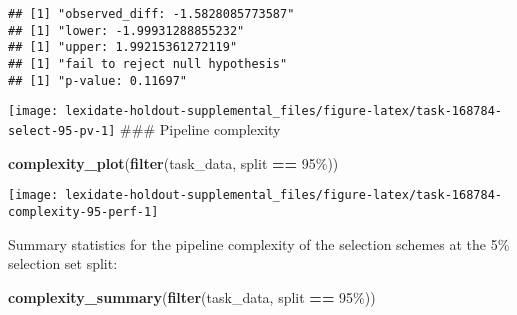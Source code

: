 \documentclass[
]{book}
\newenvironment{Shaded}{\begin{snugshade}}{\end{snugshade}}
\newcommand{\AttributeTok}[1]{\textcolor[rgb]{0.13,0.29,0.53}{#1}}
\newcommand{\DecValTok}[1]{\textcolor[rgb]{0.00,0.00,0.81}{#1}}
\newcommand{\FunctionTok}[1]{\textcolor[rgb]{0.13,0.29,0.53}{\textbf{#1}}}
\newcommand{\NormalTok}[1]{#1}
\newcommand{\OtherTok}[1]{\textcolor[rgb]{0.56,0.35,0.01}{#1}}
\newcommand{\SpecialCharTok}[1]{\textcolor[rgb]{0.81,0.36,0.00}{\textbf{#1}}}
\newcommand{\StringTok}[1]{\textcolor[rgb]{0.31,0.60,0.02}{#1}}
\begin{document}
\begin{Shaded}
\end{Shaded}

\begin{verbatim}
## [1] "observed_diff: -1.5828085773587"
## [1] "lower: -1.99931288855232"
## [1] "upper: 1.99215361272119"
## [1] "fail to reject null hypothesis"
## [1] "p-value: 0.11697"
\end{verbatim}

\texttt{[image: lexidate-holdout-supplemental\_files/figure-latex/task-168784-select-95-pv-1]}
\#\#\# Pipeline complexity

\begin{Shaded}
\begin{Highlighting}[]
\FunctionTok{complexity\_plot}\NormalTok{(}\FunctionTok{filter}\NormalTok{(task\_data, split }\SpecialCharTok{==} \StringTok{\textquotesingle{}95\%\textquotesingle{}}\NormalTok{))}
\end{Highlighting}
\end{Shaded}

\texttt{[image: lexidate-holdout-supplemental\_files/figure-latex/task-168784-complexity-95-perf-1]}

Summary statistics for the pipeline complexity of the selection schemes at the 5\% selection set split:

\begin{Shaded}
\begin{Highlighting}[]
\FunctionTok{complexity\_summary}\NormalTok{(}\FunctionTok{filter}\NormalTok{(task\_data, split }\SpecialCharTok{==} \StringTok{\textquotesingle{}95\%\textquotesingle{}}\NormalTok{))}
\end{Highlighting}
\end{Shaded}
\end{document}
